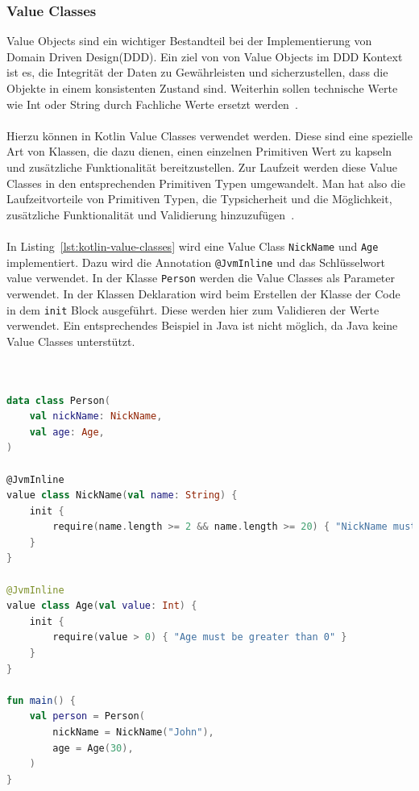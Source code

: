 \documentclass[11pt]{article}
\begin{document}
    \subsubsection{Value Classes}
    Value Objects sind ein wichtiger Bestandteil bei der Implementierung von Domain Driven Design(DDD).
    Ein ziel von von Value Objects im DDD Kontext ist es, die Integrität der Daten zu Gewährleisten und sicherzustellen, dass die Objekte in einem konsistenten Zustand sind.
    Weiterhin sollen technische Werte wie Int oder String durch Fachliche Werte ersetzt werden~\cite[219]{red-book}.\\
    \\
    Hierzu können in Kotlin Value Classes verwendet werden.
    Diese sind eine spezielle Art von Klassen, die dazu dienen, einen einzelnen Primitiven Wert zu kapseln und zusätzliche Funktionalität bereitzustellen.
    Zur Laufzeit werden diese Value Classes in den entsprechenden Primitiven Typen umgewandelt.
    Man hat also die Laufzeitvorteile von Primitiven Typen, die Typsicherheit und die Möglichkeit, zusätzliche Funktionalität und Validierung hinzuzufügen~\cite{kotlin-value-classes}.\\
    \\
    In Listing~\ref{lst:kotlin-value-classes} wird eine Value Class \texttt{NickName} und \texttt{Age} implementiert.
    Dazu wird die Annotation \texttt{@JvmInline} und das Schlüsselwort value verwendet.
    In der Klasse \texttt{Person} werden die Value Classes als Parameter verwendet.
    In der Klassen Deklaration wird beim Erstellen der Klasse der Code in dem \texttt{init} Block ausgeführt.
    Diese werden hier zum Validieren der Werte verwendet.
    Ein entsprechendes Beispiel in Java ist nicht möglich, da Java keine Value Classes unterstützt.\\
    \\

    \begin{lstlisting}[language=Kotlin, caption={ValueClasses.kt}, label={lst:kotlin-value-classes}]

data class Person(
    val nickName: NickName,
    val age: Age,
)

@JvmInline
value class NickName(val name: String) {
    init {
        require(name.length >= 2 && name.length >= 20) { "NickName must be between 2 and 20 Letters" }
    }
}

@JvmInline
value class Age(val value: Int) {
    init {
        require(value > 0) { "Age must be greater than 0" }
    }
}

fun main() {
    val person = Person(
        nickName = NickName("John"),
        age = Age(30),
    )
}
    \end{lstlisting}
\end{document}

